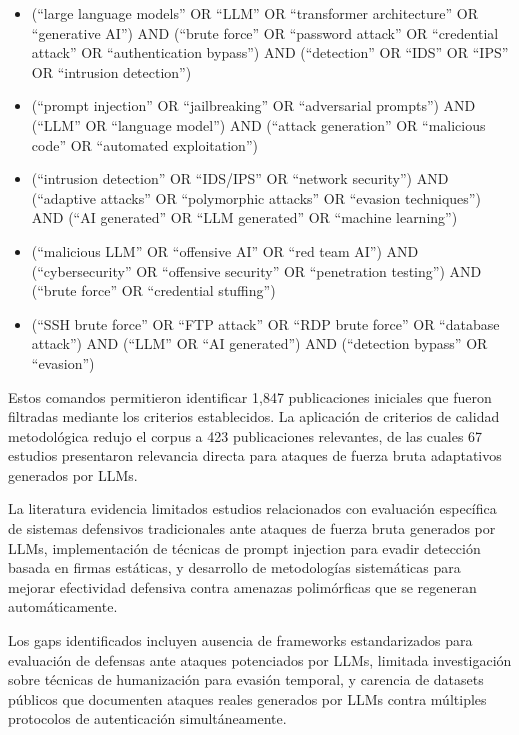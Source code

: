 \begin{itemize}
\item (``large language models'' OR ``LLM'' OR ``transformer architecture'' OR ``generative AI'') AND (``brute force'' OR ``password attack'' OR ``credential attack'' OR ``authentication bypass'') AND (``detection'' OR ``IDS'' OR ``IPS'' OR ``intrusion detection'')

\item (``prompt injection'' OR ``jailbreaking'' OR ``adversarial prompts'') AND (``LLM'' OR ``language model'') AND (``attack generation'' OR ``malicious code'' OR ``automated exploitation'')

\item (``intrusion detection'' OR ``IDS/IPS'' OR ``network security'') AND (``adaptive attacks'' OR ``polymorphic attacks'' OR ``evasion techniques'') AND (``AI generated'' OR ``LLM generated'' OR ``machine learning'')

\item (``malicious LLM'' OR ``offensive AI'' OR ``red team AI'') AND (``cybersecurity'' OR ``offensive security'' OR ``penetration testing'') AND (``brute force'' OR ``credential stuffing'')

\item (``SSH brute force'' OR ``FTP attack'' OR ``RDP brute force'' OR ``database attack'') AND (``LLM'' OR ``AI generated'') AND (``detection bypass'' OR ``evasion'')
\end{itemize}

Estos comandos permitieron identificar 1,847 publicaciones iniciales que fueron filtradas mediante los criterios establecidos. La aplicación de criterios de calidad metodológica redujo el corpus a 423 publicaciones relevantes, de las cuales 67 estudios presentaron relevancia directa para ataques de fuerza bruta adaptativos generados por LLMs.

La literatura evidencia limitados estudios relacionados con evaluación específica de sistemas defensivos tradicionales ante ataques de fuerza bruta generados por LLMs, implementación de técnicas de prompt injection para evadir detección basada en firmas estáticas, y desarrollo de metodologías sistemáticas para mejorar efectividad defensiva contra amenazas polimórficas que se regeneran automáticamente.

Los gaps identificados incluyen ausencia de frameworks estandarizados para evaluación de defensas ante ataques potenciados por LLMs, limitada investigación sobre técnicas de humanización para evasión temporal, y carencia de datasets públicos que documenten ataques reales generados por LLMs contra múltiples protocolos de autenticación simultáneamente.


